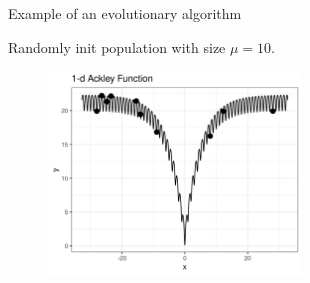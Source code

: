 \documentclass[11pt,compress,t,notes=noshow, xcolor=table]{beamer}
\begin{document}
\begin{vbframe}{Example of an evolutionary algorithm}

Randomly init population with size $\mu = 10$.
\vspace{0.5cm}

\begin{center}
\begin{figure}
  \includegraphics[width=0.6\textwidth]{figure_man/1dim-ackley-func-2.png}
\end{figure}
\end{center}

\end{vbframe}


\end{document}
